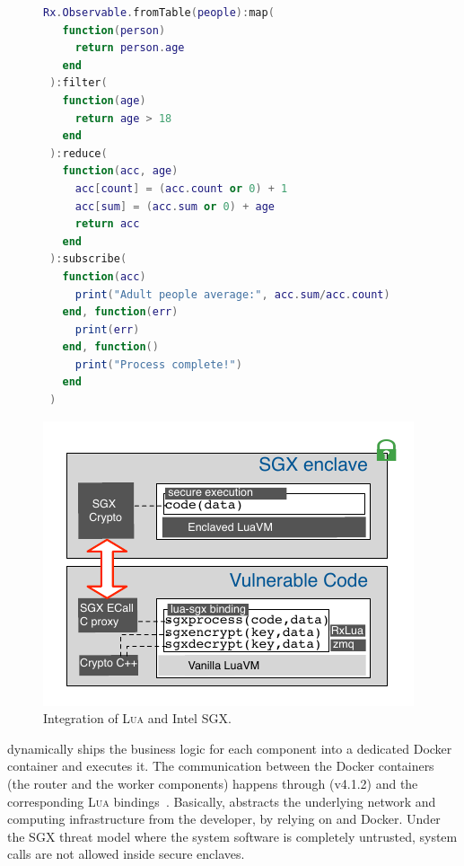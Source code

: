 \begin{figure}
\begin{minipage}[c]{.48\linewidth}
\begin{lstlisting}[language=LUA,caption={Process pipeline with \rxl.},label=pipeline-example]
Rx.Observable.fromTable(people):map(
   function(person)
     return person.age
   end
 ):filter(
   function(age)
     return age > 18
   end
 ):reduce(
   function(acc, age)
     acc[count] = (acc.count or 0) + 1
     acc[sum] = (acc.sum or 0) + age
     return acc
   end
 ):subscribe(
   function(acc)
     print("Adult people average:", acc.sum/acc.count)
   end, function(err)
     print(err)
   end, function()
     print("Process complete!")
   end
 )
\end{lstlisting}
\end{minipage}
\hfill
\begin{minipage}[c]{.48\linewidth}
  \includegraphics[width=\linewidth]{figures/arch-sgxlua}
  \caption{Integration of \textsc{Lua} and Intel SGX.}
  \label{fig:arch-luasgx}
\end{minipage}
\end{figure}
% 
\SYS{} dynamically ships the business logic for each component into a dedicated Docker container and executes it.
The communication between the Docker containers (the router and the worker components) happens through \zmq (v4.1.2) and the corresponding \textsc{Lua} bindings~\cite{github:lzmq}.
Basically, \SYS{} abstracts the underlying network and computing infrastructure from the developer, by relying on \zmq and Docker.
% 
Under the SGX threat model where the system software is completely untrusted, system calls are not allowed inside secure enclaves.
